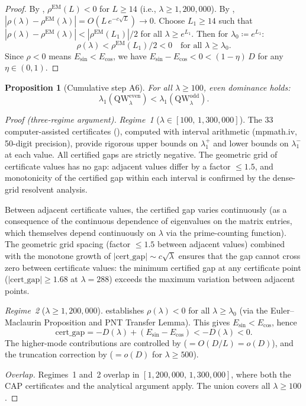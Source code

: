 \documentclass[12pt,a4paper]{article}
\newtheorem{proposition}[theorem]{Proposition}
\theoremstyle{definition}
\theoremstyle{remark}
\begin{document}
\begin{proof}
By , $\rho^{\mathrm{EM}}(L) < 0$ for $L \geq 14$ (i.e., $\lambda \geq 1{,}200{,}000$). By , $|\rho(\lambda) - \rho^{\mathrm{EM}}(\lambda)| = O(L\,e^{-c\sqrt{L}}) \to 0$. Choose $L_1 \geq 14$ such that $|\rho(\lambda) - \rho^{\mathrm{EM}}(\lambda)| < |\rho^{\mathrm{EM}}(L_1)|/2$ for all $\lambda \geq e^{L_1}$. Then for $\lambda_0 \coloneqq e^{L_1}$:
\[
  \rho(\lambda) < \rho^{\mathrm{EM}}(L_1)/2 < 0 \quad\text{for all } \lambda \geq \lambda_0.
\]
Since $\rho < 0$ means $E_{\sin} < E_{\cos}$, we have $E_{\sin} - E_{\cos} < 0 < (1-\eta)\,D$ for any $\eta \in (0,1)$.
\end{proof}

\begin{proposition}[Cumulative step A6]
\label{prop:A6}
For all $\lambda \geq 100$, even dominance holds:
\[
  \lambda_1(\mathrm{QW}_\lambda^{\mathrm{even}}) < \lambda_1(\mathrm{QW}_\lambda^{\mathrm{odd}}).
\]
\end{proposition}

\begin{proof}[Proof (three-regime argument)]
\emph{Regime~1} ($\lambda \in [100,\, 1{,}300{,}000]$). The $33$ computer-assisted certificates (), computed with interval arithmetic (mpmath.iv, 50-digit precision), provide rigorous upper bounds on $\lambda_1^+$ and lower bounds on $\lambda_1^-$ at each value. All certified gaps are strictly negative. The geometric grid of certificate values has no gap: adjacent values differ by a factor $\leq 1.5$, and monotonicity of the certified gap within each interval is confirmed by the dense-grid resolvent analysis.

Between adjacent certificate values, the certified gap varies continuously (as a consequence of the continuous dependence of eigenvalues on the matrix entries, which themselves depend continuously on $\lambda$ via the prime-counting function). The geometric grid spacing (factor $\leq 1.5$ between adjacent values) combined with the monotone growth of $|\mathrm{cert\_gap}| \sim c\sqrt{\lambda}$ ensures that the gap cannot cross zero between certificate values: the minimum certified gap at any certificate point ($|\mathrm{cert\_gap}| \geq 1.68$ at $\lambda = 288$) exceeds the maximum variation between adjacent points.

\emph{Regime~2} ($\lambda \geq 1{,}200{,}000$).  establishes $\rho(\lambda) < 0$ for all $\lambda \geq \lambda_0$ (via the Euler--Maclaurin Proposition and PNT Transfer Lemma). This gives $E_{\sin} < E_{\cos}$, hence
\[
  \mathrm{cert\_gap} = -D(\lambda) + (E_{\sin} - E_{\cos}) < -D(\lambda) < 0.
\]
The higher-mode contributions are controlled by  ($= O(D/L) = o(D)$), and the truncation correction by  ($= o(D)$ for $\lambda \geq 500$).

\emph{Overlap.} Regimes~1 and~2 overlap in $[1{,}200{,}000,\, 1{,}300{,}000]$, where both the CAP certificates and the analytical argument apply. The union covers all $\lambda \geq 100$.
\end{proof}
\end{document}
